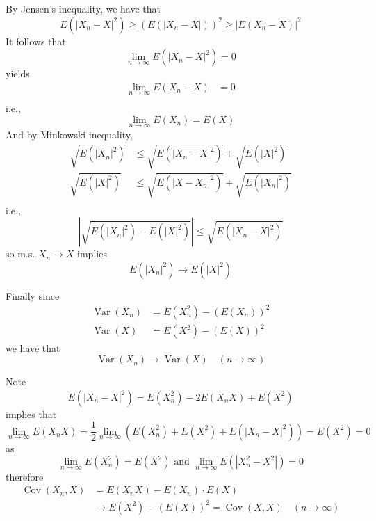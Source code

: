\documentclass{homework}
\DeclareMathOperator{\var}{Var}
\DeclareMathOperator{\cov}{Cov}
\begin{document}
    \problem
    \begin{subproblem}
        \item
        By Jensen's inequality, we have that
        \[E(|X_n-X|^2)\geq (E(|X_n-X|))^2\geq |E(X_n-X)|^2\]
        It follows that 
        \[\lim_{n\to\infty}E(|X_n-X|^2)=0\]
        yields
        \[\begin{aligned}
            \lim_{n\to\infty}E(X_n-X)&=0\\
        \end{aligned}\]
        i.e.,
        \[\lim_{n\to\infty}E(X_n)=E(X)\]
        And by Minkowski inequality,
        \[\begin{aligned}
            \sqrt{E(|X_n|^2)}&\leq\sqrt{E(|X_n-X|^2)}+\sqrt{E(|X|^2)}\\
            \sqrt{E(|X|^2)}&\leq\sqrt{E(|X-X_n|^2)}+\sqrt{E(|X_n|^2)}\\
        \end{aligned}\]
        i.e.,
        \[\left|\sqrt{E(|X_n|^2)-E(|X|^2)}\right|
        \leq\sqrt{E(|X_n-X|^2)}\]
        so m.s. $X_n\to X$ implies
        \[E(|X_n|^2)\to E(|X|^2)\]

        Finally since
        \[\begin{aligned}
            \var(X_n)&=E(X_n^2)-(E(X_n))^2\\
            \var(X)&=E(X^2)-(E(X))^2
        \end{aligned}\]
        we have that
        \[\var(X_n)\to\var(X)\quad(n\to\infty)\]

        \item
        Note
        \[E(|X_n-X|^2)=E(X_n^2)-2E(X_nX)+E(X^2)\]
        implies that
        \[\lim_{n\to\infty}E(X_nX)
        =\frac{1}{2}\lim_{n\to\infty}\left(E(X_n^2)+E(X^2)+E(|X_n-X|^2)\right)
        =E(X^2)=0\]
        as
        \[\lim_{n\to\infty}E(X_n^2)=E(X^2)
        \text{ and }
        \lim_{n\to\infty}E(|X_n^2-X^2|)=0\]
        therefore
        \[\begin{aligned}
            \cov(X_n,X)&=E(X_nX)-E(X_n)\cdot E(X)\\
            &\to E(X^2)-(E(X))^2=\cov(X,X)\quad(n\to\infty)
        \end{aligned}\]
    \end{subproblem}
\end{document}
